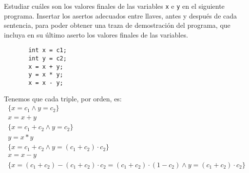 \begin{ejercicio}
   Estudiar cuáles son los valores finales de las variables \verb|x| e \verb|y| en el siguiente programa. Insertar los asertos adecuados entre llaves, antes y después de cada sentencia, para poder obtener una traza de demostración del programa, que incluya en su último aserto los valores finales de las variables. 
   \begin{verbatim}
       int x = c1;
       int y = c2;
       x = x + y;
       y = x * y;
       x = x - y;
   \end{verbatim}

   Tenemos que cada triple, por orden, es:
   \begin{gather*}
       \{x = c_1 \land y = c_2\}\\
       x = x + y \\
       \{x = c_1 + c_2 \land y =c_2\} \\
       y = x * y \\
       \{x = c_1 + c_2 \land y = (c_1 + c_2)\cdot c_2 \} \\
       x = x - y \\
       \{x = (c_1 + c_2) - (c_1 + c_2)\cdot c_2 = (c_1 + c_2)\cdot (1-c_2) \land y = (c_1 + c_2)\cdot c_2 \}
   \end{gather*}
\end{ejercicio}

